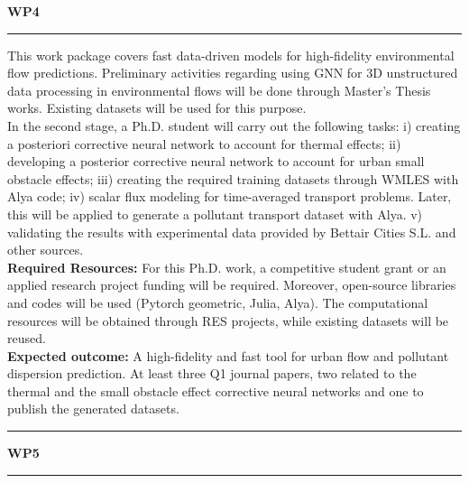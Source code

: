 \documentclass{article}
\begin{document}
{ \bf WP4 }
\vspace{4pt}
\hrule
This work package covers fast data-driven models for high-fidelity environmental flow predictions. Preliminary activities regarding using GNN for 3D unstructured data processing in environmental flows will be done through Master's Thesis works. Existing datasets will be used for this purpose.\\ 
In the second stage, a Ph.D. student will carry out the following tasks: i) creating a posteriori corrective neural network to account for thermal effects; ii) developing a posterior corrective neural network to account for urban small obstacle effects; iii) creating the required training datasets through WMLES with Alya code; iv) scalar flux modeling for time-averaged transport problems. Later, this will be applied to generate a pollutant transport dataset with Alya. v) validating the results with experimental data provided by  Bettair Cities S.L. and other sources.\\
{\bf Required Resources:} For this Ph.D. work, a competitive student grant or an applied research project funding will be required. Moreover, open-source libraries and codes will be used (Pytorch geometric, Julia, Alya). The computational resources will be obtained through RES projects, while existing datasets will be reused.  \\
{\bf Expected outcome:} A high-fidelity and fast tool for urban flow and pollutant dispersion prediction. At least three Q1 journal papers, two related to the thermal and the small obstacle effect corrective neural networks and one to publish the generated datasets. 
\vspace{4pt}
\hrule

\vspace{0.5cm}

{ \bf WP5 }
\vspace{4pt}
\hrule
\end{document}
